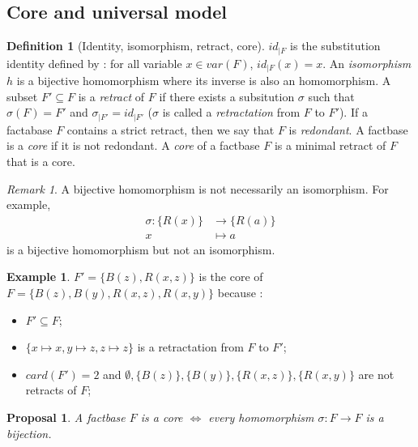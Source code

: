 \documentclass{article}
\newtheorem{proposal}{Proposal}[section]
\theoremstyle{definition}
\newtheorem{definition}{Definition}[section]
\newtheorem{example}{Example}[section]
\theoremstyle{remark}
\newtheorem{remark}{Remark}[section]
\begin{document}
\subsection{Core and universal model}

\begin{definition}[Identity, isomorphism, retract, core]
$id_{|F}$ is the substitution identity defined by : for all variable $x \in var(F)$, $id_{|F}(x) = x$. An \emph{isomorphism} $h$ is a bijective homomorphism where its inverse is also an homomorphism. A subset $F' \subseteq F$ is a \emph{retract} of $F$ if there exists a subsitution $\sigma$ such that $\sigma(F) = F'$ and $\sigma_{|F'}=id_{|F'}$ %
($\sigma$ is called a \emph{retractation} from $F$ to $F'$). If a factabase $F$ contains a strict retract, then we say that $F$ is \emph{redondant}. A factbase is a \emph{core} if it is not redondant. A \emph{core} of a factbase $F$ is a minimal retract of $F$ that is a core.
\end{definition}

\begin{remark}
A bijective homomorphism is not necessarily an isomorphism. For example, 
\begin{align*}
\sigma:\{R(x)\} &\to \{R(a)\}\\
x &\mapsto a
\end{align*}
is a bijective homomorphism but not an isomorphism.
\end{remark}

\begin{example}
$F' = \{B(z),R(x,z)\}$ is the core of $F = \{B(z),B(y),R(x,z),R(x,y)\}$ because : 
\begin{itemize}
\item $F' \subseteq F$;
\item $\{x \mapsto x, y \mapsto z, z \mapsto z\}$ is a retractation from $F$ to $F'$;
\item $card(F') = 2$ and $\emptyset, \{B(z)\},\{B(y)\},\{R(x,z)\},\{R(x,y)\}$ are not retracts of $F$;
\end{itemize}
\end{example}

\begin{proposal}
A factbase $F$ is a core $\Leftrightarrow$ every homomorphism $\sigma: F \to F$ is a bijection.
\end{proposal}
\end{document}
